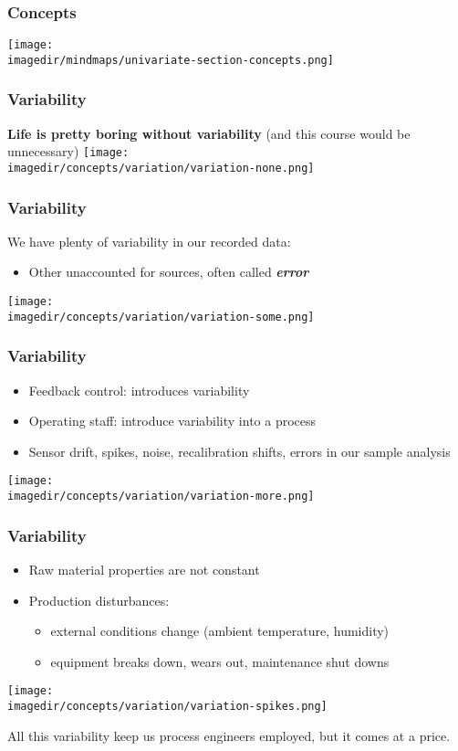 \begin{frame}\frametitle{Concepts}
	\texttt{[image: \\imagedir/mindmaps/univariate-section-concepts.png]}
\end{frame}

\begin{frame}\frametitle{Variability}
	\textbf{Life is pretty boring without variability} (and this course would be unnecessary)
	\texttt{[image: \\imagedir/concepts/variation/variation-none.png]}
\end{frame}

\begin{frame}\frametitle{Variability}
	We have plenty of variability in our recorded data:
	\begin{itemize}
		\item Other unaccounted for sources, often called \textbf{\emph{error}}
	\end{itemize}
	\texttt{[image: \\imagedir/concepts/variation/variation-some.png]}
\end{frame}

\begin{frame}\frametitle{Variability}
	\begin{itemize}
		\item Feedback control: introduces variability
		\item Operating staff: introduce variability into a process
		\item Sensor drift, spikes, noise, recalibration shifts, errors in our sample analysis
	\end{itemize}

	\texttt{[image: \\imagedir/concepts/variation/variation-more.png]}
\end{frame}

\begin{frame}\frametitle{Variability}
	\begin{itemize}
		\item Raw material properties are not constant
		\item Production disturbances:
		\begin{itemize}
			\item external conditions change (ambient temperature, humidity)
			\item equipment breaks down, wears out, maintenance shut downs
		\end{itemize}
	\end{itemize}

	\texttt{[image: \\imagedir/concepts/variation/variation-spikes.png]}

	All this variability keep us process engineers employed, but it comes at a price.
\end{frame}


